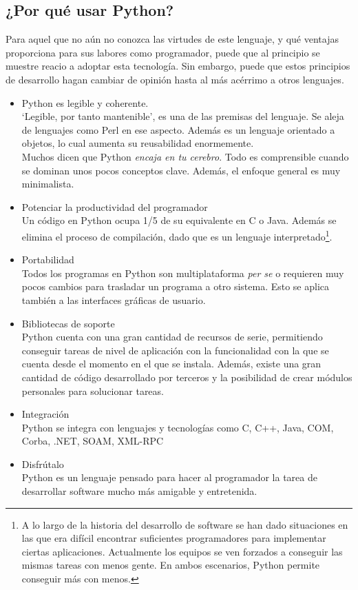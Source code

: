 \documentclass[12pt]{article} %
\begin{document}
\subsection{¿Por qué usar Python?}
	Para aquel que no aún no conozca las virtudes de este lenguaje, y qué ventajas proporciona para sus labores como programador, puede que al principio se muestre reacio a adoptar esta tecnología. Sin embargo, puede que estos principios de desarrollo hagan cambiar de opinión hasta al más acérrimo a otros lenguajes.
	\begin{itemize}
		\item Python es legible y coherente.\\
			`Legible, por tanto mantenible', es una de las premisas del lenguaje. Se aleja de lenguajes como Perl en ese aspecto. Además es un lenguaje orientado a objetos, lo cual aumenta su reusabilidad enormemente.\\
			Muchos dicen que Python \textit{encaja en tu cerebro}. Todo es comprensible cuando se dominan unos pocos conceptos clave. Además, el enfoque general es muy minimalista.
		\item Potenciar la productividad del programador\\
			Un código en Python ocupa 1/5 de su equivalente en C o Java. Además se elimina el proceso de compilación, dado que es un lenguaje interpretado\footnote{A lo largo de la historia del desarrollo de software se han dado situaciones en las que era difícil encontrar suficientes programadores para implementar ciertas aplicaciones. Actualmente los equipos se ven forzados a conseguir las mismas tareas con menos gente. En ambos escenarios, Python permite conseguir más con menos.}.
		\item Portabilidad\\
			Todos los programas en Python son multiplataforma \textit{per se} o requieren muy pocos cambios para trasladar un programa a otro sistema. Esto se aplica también a las interfaces gráficas de usuario.
		\item Bibliotecas de soporte\\
			Python cuenta con una gran cantidad de recursos de serie, permitiendo conseguir tareas de nivel de aplicación con la funcionalidad con la que se cuenta desde el momento en el que se instala. Además, existe una gran cantidad de código desarrollado por terceros y la posibilidad de crear módulos personales para solucionar tareas.
		\item Integración\\
			Python se integra con lenguajes y tecnologías como C, C++, Java, COM, Corba, .NET, SOAM, XML-RPC
		\item Disfrútalo\\
			Python es un lenguaje pensado para hacer al programador la tarea de desarrollar software mucho más amigable y entretenida.
	\end{itemize}
		
\end{document}
